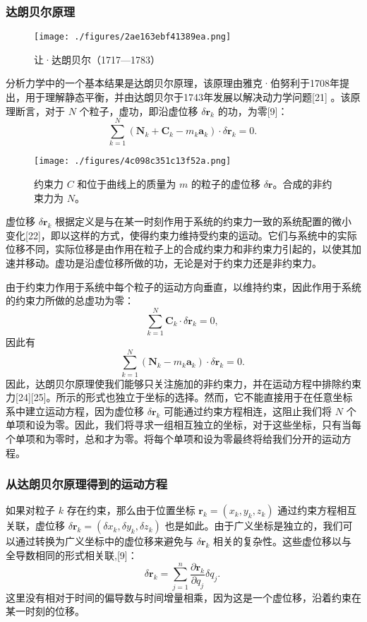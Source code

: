 \subsubsection{达朗贝尔原理}
\begin{figure}[ht]
\centering
\texttt{[image: ./figures/2ae163ebf41389ea.png]}
\caption{让·达朗贝尔（1717—1783）} \label{fig_LGL_5}
\end{figure}
分析力学中的一个基本结果是达朗贝尔原理，该原理由雅克·伯努利于1708年提出，用于理解静态平衡，并由达朗贝尔于1743年发展以解决动力学问题[21] 。该原理断言，对于 \(N\) 个粒子，虚功，即沿虚位移 \(\delta \mathbf{r}_k\) 的功，为零[9]：
\[
\sum_{k=1}^{N}(\mathbf{N}_{k}+\mathbf{C}_{k}-m_{k}\mathbf{a}_{k}) \cdot \delta \mathbf{r}_{k} = 0.~
\]
\begin{figure}[ht]
\centering
\texttt{[image: ./figures/4c098c351c13f52a.png]}
\caption{约束力 \(C\) 和位于曲线上的质量为 \(m\) 的粒子的虚位移 \(\delta \mathbf{r}\)。合成的非约束力为 \(N\)。} \label{fig_LGL_6}
\end{figure}
虚位移 \(\delta \mathbf{r}_k\) 根据定义是与在某一时刻作用于系统的约束力一致的系统配置的微小变化[22]，即以这样的方式，使得约束力维持受约束的运动。它们与系统中的实际位移不同，实际位移是由作用在粒子上的合成约束力和非约束力引起的，以使其加速并移动。虚功是沿虚位移所做的功，无论是对于约束力还是非约束力。

由于约束力作用于系统中每个粒子的运动方向垂直，以维持约束，因此作用于系统的约束力所做的总虚功为零：
\[
\sum_{k=1}^{N} \mathbf{C}_{k} \cdot \delta \mathbf{r}_{k} = 0,~
\]
因此有
\[
\sum_{k=1}^{N} (\mathbf{N}_{k} - m_{k} \mathbf{a}_{k}) \cdot \delta \mathbf{r}_{k} = 0.~
\]
因此，达朗贝尔原理使我们能够只关注施加的非约束力，并在运动方程中排除约束力[24][25]。所示的形式也独立于坐标的选择。然而，它不能直接用于在任意坐标系中建立运动方程，因为虚位移 \(\delta \mathbf{r}_k\) 可能通过约束方程相连，这阻止我们将 \(N\) 个单项和设为零。因此，我们将寻求一组相互独立的坐标，对于这些坐标，只有当每个单项和为零时，总和才为零。将每个单项和设为零最终将给我们分开的运动方程。
\subsubsection{从达朗贝尔原理得到的运动方程}  
如果对粒子 \(k\) 存在约束，那么由于位置坐标 \( \mathbf{r}_k = (x_k, y_k, z_k) \) 通过约束方程相互关联，虚位移 \( \delta \mathbf{r}_k = (\delta x_k, \delta y_k, \delta z_k) \) 也是如此。由于广义坐标是独立的，我们可以通过转换为广义坐标中的虚位移来避免与 \( \delta \mathbf{r}_k \) 相关的复杂性。这些虚位移以与全导数相同的形式相关联,[9]：
\[
\delta \mathbf{r}_k = \sum_{j=1}^{n} \frac{\partial \mathbf{r}_k}{\partial q_j} \delta q_j.~
\]
这里没有相对于时间的偏导数与时间增量相乘，因为这是一个虚位移，沿着约束在某一时刻的位移。

